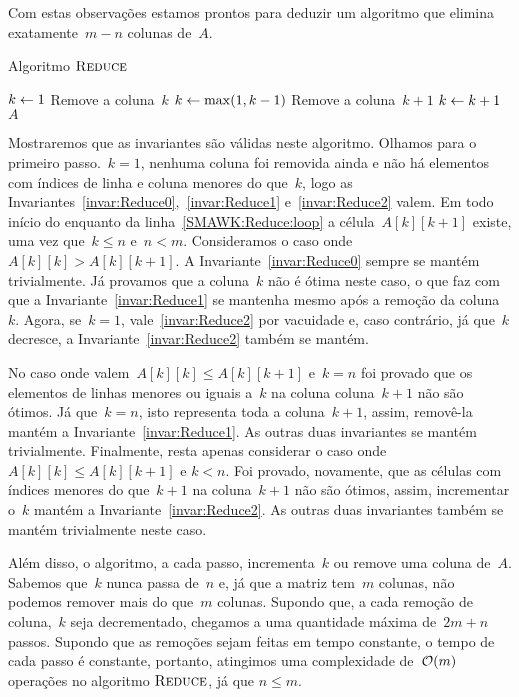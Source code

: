 Com estas observações estamos prontos para deduzir um algoritmo que elimina exatamente~${ m-n }$ colunas de~$A$. 

\newcommand{\Reduce}{\textsc{Reduce}}
\begin{algorithm}[H]
\caption{Algoritmo $\Reduce$}
\label{SMAWK:algo:Reduce}
\begin{algorithmic}[1]
\Function{\Reduce}{A}
    \State $k \leftarrow 1$
     \label{SMAWK:Reduce:loop}
            \State Remove a coluna~$k$
            \State $k \leftarrow \max(1,k-1)$
        \Else
                \State Remove a coluna~$k+1$
            \Else
                \State $k \leftarrow k+1$
            \EndIf
        \EndIf
    \EndWhile
    \State \Return $A$
\EndFunction
\end{algorithmic}
\end{algorithm}

Mostraremos que as invariantes são válidas neste algoritmo. Olhamos para o primeiro passo.~$k = 1$, nenhuma coluna foi removida ainda e não há elementos com índices de linha e coluna menores do que~$k$, logo as Invariantes~\eqref{invar:Reduce0},~\eqref{invar:Reduce1} e~\eqref{invar:Reduce2} valem. Em todo início do enquanto da linha~\ref{SMAWK:Reduce:loop} a célula~$A[k][k+1]$ existe, uma vez que~${ k \leq n }$ e~${ n < m }$. Consideramos o caso onde~${ A[k][k] > A[k][k+1] }$. A Invariante~\eqref{invar:Reduce0} sempre se mantém trivialmente. Já provamos que a coluna~$k$ não é ótima neste caso, o que faz com que a Invariante~\eqref{invar:Reduce1} se mantenha mesmo após a remoção da coluna~$k$. Agora, se~${ k=1 }$, vale~\eqref{invar:Reduce2} por vacuidade e, caso contrário, já que~$k$ decresce, a Invariante~\eqref{invar:Reduce2} também se mantém. 

No caso onde valem~$A[k][k] \leq A[k][k+1]$ e~$k = n$ foi provado que os elementos de linhas menores ou iguais a~$k$ na coluna coluna~$k+1$ não são ótimos. Já que~${ k = n }$, isto representa toda a coluna~${ k+1 }$, assim, removê-la mantém a Invariante~\eqref{invar:Reduce1}. As outras duas invariantes se mantém trivialmente. Finalmente, resta apenas considerar o caso onde~$A[k][k] \leq A[k][k+1]$ e $k < n$. Foi provado, novamente, que as células com índices menores do que~${ k + 1 }$ na coluna~${ k + 1 }$ não são ótimos, assim, incrementar o~$k$ mantém a Invariante~\eqref{invar:Reduce2}. As outras duas invariantes também se mantém trivialmente neste caso. 

Além disso, o algoritmo, a cada passo, incrementa~$k$ ou remove uma coluna de~$A$. Sabemos que~$k$ nunca passa de~$n$ e, já que a matriz tem~$m$ colunas, não podemos remover mais do que~$m$ colunas. Supondo que, a cada remoção de coluna,~$k$ seja decrementado, chegamos a uma quantidade máxima de~$2m + n$ passos. Supondo que as remoções sejam feitas em tempo constante, o tempo de cada passo é constante, portanto, atingimos uma complexidade de~$\mathcal{O}(m)$ operações no algoritmo $\Reduce$, já que $n \leq m$.

